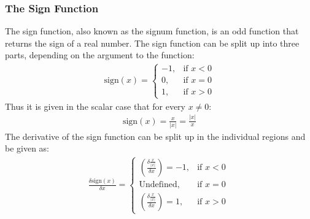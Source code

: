 \subsubsection{The Sign Function}
\label{subsubsec:sign}
The sign function, also known as the signum function, is an odd
function that returns the sign of a real number. The sign function can
be split up into three parts, depending on the argument to the
function:
\begin{align}
\text{sign}(x) =
\begin{cases}
-1, &\text{if } x<0\\
0, &\text{if } x=0\\
1, &\text{if } x>0
\end{cases}
\end{align}
Thus it is given in the scalar case that for every $x \neq 0$:
\begin{align}
\text{sign}(x) = \frac{x}{|x|} = \frac{|x|}{x}
\end{align}
The derivative of the sign function can be split up in the individual regions and be given as:
\begin{align}
\frac{\delta \text{sign}(x)}{\delta x} =
\begin{cases}
\left(\frac{\delta \frac{x}{|x|}}{\delta x}\right) = -1, &\text{if } x<0\\
\text{Undefined}, &\text{if } x=0\\
\left(\frac{\delta \frac{x}{|x|}}{\delta x}\right) = 1, &\text{if } x>0\
\end{cases}
\end{align}

